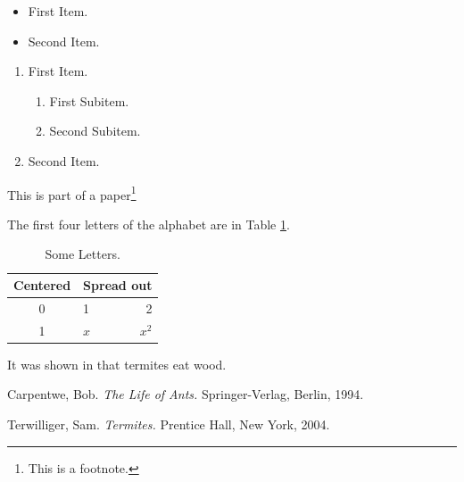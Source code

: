 \documentclass[12pt]{article}
\begin{document}
\begin{itemize}
\item First Item.
\item Second Item.
\end{itemize}

\begin{enumerate}
\item First Item.
	\begin{enumerate}
	\item First Subitem.
	\item Second Subitem.
	\end{enumerate}
\item Second Item.
\end{enumerate}

This is part of
a paper\footnote{This is a footnote.}

The first four letters of the alphabet are in Table \ref{alpha}.

\begin{table}
\centering
\begin{tabular}{|c|l|r|}
\hline
Centered & \multicolumn{2}{c|}{Spread out} \\
\hline
0 & 1 & 2\\
1 & $x$ & $x^2$\\
\hline
\end{tabular}
\caption{Some Letters.}
\label{alpha}
\end{table}

It was shown in \cite{Te} that termites eat wood.


\begin{thebibliography}{99}
Carpentwe, Bob.  \textsl{The Life of Ants.}
Springer-Verlag, Berlin, 1994.

Terwilliger, Sam.  \textsl{Termites.}
Prentice Hall, New York, 2004.
\end{thebibliography}
\end{document}

